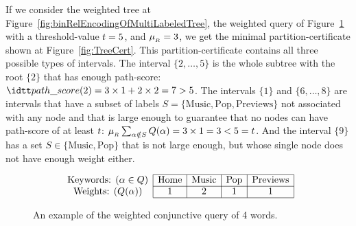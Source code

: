 If we consider the weighted tree at Figure~\ref{fig:binRelEncodingOfMultiLabeledTree}, the weighted query of  Figure~\ref{fig:TreeQuery} with a threshold-value $t = 5$, and $\mu_{_{R}} = 3$, we get the minimal partition-certificate shown at Figure~\ref{fig:TreeCert}. This partition-certificate contains all three possible types of intervals. The interval $\{2, \ldots, 5\}$ is the whole subtree with the root $\{2\}$ that has enough path-score: $\pathscore (2) = 3 \times 1 + 2 \times 2 = 7 > 5$. The intervals $\{1\}$ and $\{6, \ldots, 8\}$ are intervals that have a subset of labels $S = \{\mbox{Music}, \mbox{Pop}, \mbox{Previews} \}$ not associated with any node and that is large enough to guarantee that no nodes can have path-score of at least $t$: $\mu_{_{R}} \sum_{\alpha \notin S} {Q (\alpha)} = 3 \times 1 = 3 < 5 = t$. And the interval $\{9\}$ has a set $S \in \{\mbox{Music}, \mbox{Pop}\}$ that is not large enough, but whose single node does not have enough weight either.

\begin{figure}
  \centering
  $$\begin{array} {c|c|c|c|c|} \cline{2-5}
    \mbox{Keywords: ($\labelx \in \Q$)}  & \mbox{Home}  &  \mbox{Music}  &  \mbox{Pop}  &  \mbox{Previews} \\ \cline{2-5}
    \mbox{Weights: ($\Q (\labelx)$)}  &           1  &             2  &           1  &              1 \\ \cline{2-5}
  \end{array}$$
  \caption{An example of the weighted conjunctive query of 4 words.
    \label{fig:TreeQuery} }
\end{figure}

